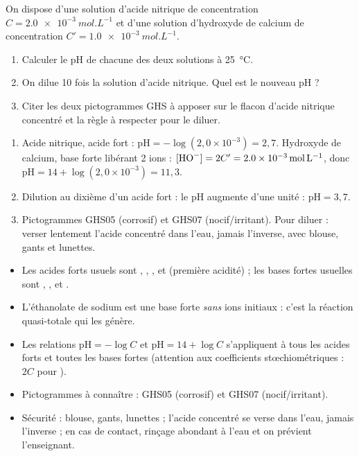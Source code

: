 \documentclass[11pt]{article}
\begin{document}
\begin{exercice}
On dispose d'une solution d'acide nitrique  de concentration $C = \SI{2,0e-3}{mol.L^{-1}}$ et d'une solution d'hydroxyde de calcium  de concentration $C' = \SI{1,0e-3}{mol.L^{-1}}$.
\begin{enumerate}
\item Calculer le pH de chacune des deux solutions à \SI{25}{\celsius}.
\item On dilue 10 fois la solution d'acide nitrique. Quel est le nouveau pH ?
\item Citer les deux pictogrammes GHS à apposer sur le flacon d'acide nitrique concentré et la règle à respecter pour le diluer.
\end{enumerate}
\end{exercice}

\begin{corrige}[Exercice]
\begin{enumerate}
\item Acide nitrique, acide fort : $\mathrm{pH} = -\log(2{,}0 \times 10^{-3}) = 2{,}7$. Hydroxyde de calcium, base forte libérant 2 ions  : $[\ce{HO-}] = 2C' = \SI{2,0e-3}{mol.L^{-1}}$, donc $\mathrm{pH} = 14 + \log(2{,}0 \times 10^{-3}) = 11{,}3$.
\item Dilution au dixième d'un acide fort : le pH augmente d'une unité : $\mathrm{pH} = 3{,}7$.
\item Pictogrammes GHS05 (corrosif) et GHS07 (nocif/irritant). Pour diluer : verser lentement l'acide concentré dans l'eau, jamais l'inverse, avec blouse, gants et lunettes.
\end{enumerate}
\end{corrige}

\begin{aretenir}
\begin{itemize}
\item Les acides forts usuels sont , , ,  et  (première acidité) ; les bases fortes usuelles sont , ,  et .
\item L'éthanolate de sodium est une base forte \emph{sans} ions  initiaux : c'est la réaction quasi-totale  qui les génère.
\item Les relations $\mathrm{pH} = -\log C$ et $\mathrm{pH} = 14 + \log C$ s'appliquent à tous les acides forts et toutes les bases fortes (attention aux coefficients stœchiométriques : $2C$ pour ).
\item Pictogrammes à connaître : GHS05 (corrosif) et GHS07 (nocif/irritant).
\item Sécurité : blouse, gants, lunettes ; l'acide concentré se verse dans l'eau, jamais l'inverse ; en cas de contact, rinçage abondant à l'eau et on prévient l'enseignant.
\end{itemize}
\end{aretenir}
\end{document}
